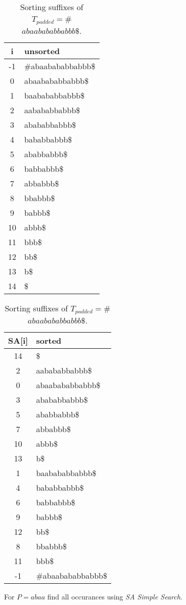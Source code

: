 \begin{table}[h]
  \footnotesize
	\begin{tabular}{c|l}
		i & unsorted \\ \hline
		-1 & \#abaabababbabbb\$ \\
		0 & abaabababbabbb\$ \\
		1 & baabababbabbb\$ \\
		2 & aabababbabbb\$ \\
		3 & abababbabbb\$ \\
		4 & bababbabbb\$ \\
		5 & ababbabbb\$ \\
		6 & babbabbb\$ \\
		7 & abbabbb\$ \\
		8 & bbabbb\$ \\
		9 & babbb\$ \\
		10 & abbb\$ \\
		11 & bbb\$ \\
		12 & bb\$ \\
		13 & b\$ \\
		14 & \$ \\
	\end{tabular} 
  \hspace*{1cm}
	\begin{tabular}{c|l}
		SA[i] & sorted \\ \hline
		14 & \$ \\
		2 & aabababbabbb\$ \\
		0 & abaabababbabbb\$ \\
		3 & abababbabbb\$ \\
		5 & ababbabbb\$ \\
		7 & abbabbb\$ \\
		10 & abbb\$ \\
		13 & b\$ \\
		1 & baabababbabbb\$ \\
		4 & bababbabbb\$ \\
		6 & babbabbb\$ \\
		9 & babbb\$ \\
		12 & bb\$ \\
		8 & bbabbb\$ \\
		11 & bbb\$ \\
		-1 & \#abaabababbabbb\$ \\
	\end{tabular} 
	\label{sortingsuffixes}
	\caption{Sorting suffixes of $T_{padded}=$\#$abaabababbabbb\$$.}
\end{table}

For $P=abaa$ find all occurances using \textit{SA Simple Search}.

